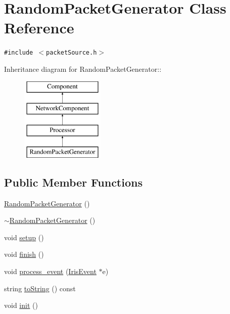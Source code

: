 \hypertarget{classRandomPacketGenerator}{
\section{RandomPacketGenerator Class Reference}
\label{classRandomPacketGenerator}
}
{\tt \#include $<$packetSource.h$>$}

Inheritance diagram for RandomPacketGenerator::\begin{figure}[H]
\begin{center}
\leavevmode
\includegraphics[height=4cm]{classRandomPacketGenerator}
\end{center}
\end{figure}
\subsection*{Public Member Functions}
\begin{CompactItemize}
\item 
\hyperlink{classRandomPacketGenerator_e8b40229ae967bfcf93c8602d197c202}{RandomPacketGenerator} ()
\item 
\hyperlink{classRandomPacketGenerator_1949b75c1466956c53e9df235e3405f7}{$\sim$RandomPacketGenerator} ()
\item 
void \hyperlink{classRandomPacketGenerator_56eccc2d487bfed691a85afbd0c5b06d}{setup} ()
\item 
void \hyperlink{classRandomPacketGenerator_c1a1572bfc2c04b24e2d5c3d1bac2eb3}{finish} ()
\item 
void \hyperlink{classRandomPacketGenerator_127a1f17b384e0418f055b0c22eb925a}{process\_\-event} (\hyperlink{classIrisEvent}{IrisEvent} $\ast$e)
\item 
string \hyperlink{classRandomPacketGenerator_4031f11000db9e2693c761f7f47a4c88}{toString} () const 
\item 
void \hyperlink{classRandomPacketGenerator_8ede37fd74eea4e7183128d011715cdd}{init} ()
\end{CompactItemize}
